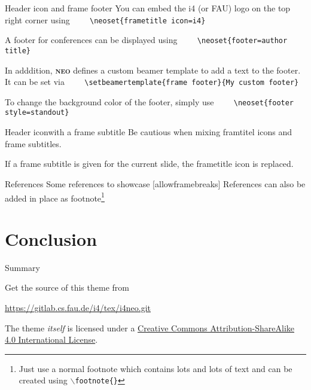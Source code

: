 \documentclass[10pt]{beamer}
\newcommand{\themename}{\textbf{\textsc{neo}}\xspace}
\begin{document}
{%

\begin{frame}[fragile]{Header icon and frame footer}
    You can embed the i4 (or FAU) logo on the top right corner using
    \verb|    \neoset{frametitle icon=i4}|

    A footer for conferences can be displayed using
    \verb|    \neoset{footer=author title}|

    In adddition, \themename defines a custom beamer template to add a text to the footer. It can be set via
    \verb|    \setbeamertemplate{frame footer}{My custom footer}|

    To change the background color of the footer, simply use \verb|    \neoset{footer style=standout}|
\end{frame}

\begin{frame}[fragile]{Header icon}{with a frame subtitle}
    Be cautious when mixing framtitel icons and frame subtitles.

    If a frame subtitle is given for the current slide, the frametitle icon is replaced.
\end{frame}
}

\begin{frame}{References}
  Some references to showcase [allowframebreaks] \cite{knuth92,ConcreteMath,Simpson,Er01,greenwade93}
  References can also be added in place as footnote\footnote{Just use a normal footnote which contains lots and lots of text and can be created using \texttt{$\backslash$footnote\{\}}}
\end{frame}

\section{Conclusion}

\begin{frame}{Summary}

  Get the source of this theme from

  \begin{center}\url{https://gitlab.cs.fau.de/i4/tex/i4neo.git}\end{center}

  The theme \emph{itself} is licensed under a
  \href{http://creativecommons.org/licenses/by-sa/4.0/}{Creative Commons
  Attribution-ShareAlike 4.0 International License}.

  \begin{center}\ccbysa\end{center}

\end{frame}
\end{document}

